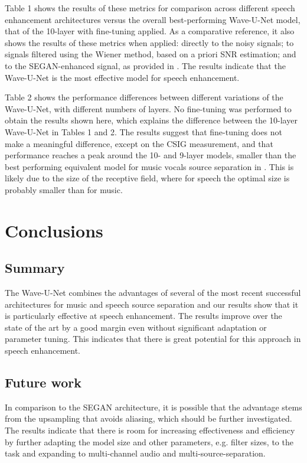 \documentclass{article}
\begin{document}
Table 1 shows the results of these metrics for comparison across different speech enhancement architectures versus the overall best-performing Wave-U-Net model, that of the 10-layer with fine-tuning applied. 
As a comparative reference, it also shows the results of these metrics when applied: directly to the noisy signals; to signals filtered using the Wiener method, based on a priori SNR estimation; and to the SEGAN-enhanced signal, as provided in \citep{Pascual2017}. 
The results indicate that the Wave-U-Net is the most effective model for speech enhancement.

Table 2 shows the performance differences between different variations of the Wave-U-Net, 
with different numbers of layers. No fine-tuning was performed to obtain the results shown here, which explains the difference between the 10-layer Wave-U-Net in Tables 1 and 2. 
The results suggest that fine-tuning does not make a meaningful difference, except on the CSIG measurement, and that performance reaches a peak around the 10- and 9-layer models, smaller than the best performing equivalent model for music vocals source separation in \citep{Stoller2018Wave-U-Net:Separation}.
This is likely due to the size of the receptive field, where for speech the optimal size is probably smaller than for music.









\section{Conclusions}\label{sec:conclusions}

\subsection{Summary}
The Wave-U-Net combines the advantages of several of the most recent successful architectures for music and speech source separation and our results show that it is particularly effective at speech enhancement.  
The results improve over the state of the art by a good margin even without significant adaptation or parameter tuning. 
This indicates that there is great potential for this approach in speech enhancement.

\subsection{Future work}
In comparison to the SEGAN architecture, it is possible that the advantage stems from the upsampling that avoids aliasing, which should be further investigated. 
The results indicate that there is room for increasing effectiveness and efficiency by further adapting the model size and other parameters, e.g. filter sizes, to the task and expanding to multi-channel audio and multi-source-separation.  













\small

 
\end{document}
